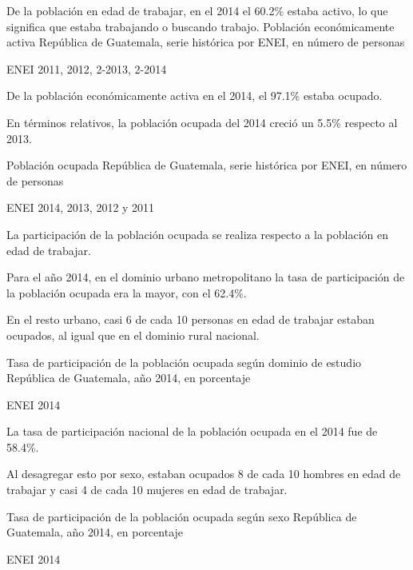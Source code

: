  
 
 {%
 De la población en edad de trabajar, en el 2014 el 60.2\% estaba activo, lo que significa que estaba trabajando o buscando trabajo.
 }%
 {%
 	Población económicamente activa} %
 {%
 	República de Guatemala, serie histórica por ENEI, en número de personas} %
 {%
 	\begin{tikzpicture}[x=1pt,y=1pt]    \end{tikzpicture}}%
 {%
 	ENEI 2011, 2012, 2-2013, 2-2014} %
 
 
  
  {%
 De la población económicamente activa en el 2014, el 97.1\% estaba ocupado.
 
 En términos relativos, la población ocupada del 2014 creció un 5.5\% respecto al 2013.}%
  {%
  	Población ocupada} %
  {%
  	República de Guatemala, serie histórica por ENEI, en número de personas} %
  {%
  	\begin{tikzpicture}[x=1pt,y=1pt]    \end{tikzpicture}}%
  {%
  	ENEI 2014, 2013, 2012 y 2011} %
  
  
  
  
  {%
La participación de la población ocupada se realiza respecto a la población en edad de trabajar.

Para el año 2014, en el dominio urbano metropolitano la tasa de participación de la población ocupada era la mayor, con el 62.4\%. 

En el resto urbano, casi 6 de cada 10 personas en edad de trabajar estaban ocupados, al igual que en el dominio rural nacional. }%
  {%
  	Tasa de participación de la población ocupada según dominio de estudio} %
  {%
  	República de Guatemala, año 2014, en porcentaje} %
  {%
  	\begin{tikzpicture}[x=1pt,y=1pt]    \end{tikzpicture}}%
  {%
  	ENEI 2014} %
  
  
 
 {%
 La tasa de participación nacional de la población ocupada en el 2014 fue de 58.4\%.
 
 Al desagregar esto por sexo, estaban ocupados 8 de cada 10 hombres en edad de trabajar y casi 4 de cada 10 mujeres en edad de trabajar.}%
 {%
 	Tasa de participación de la población ocupada según sexo} %
 {%
 	República de Guatemala, año 2014, en porcentaje} %
 {%
 	\begin{tikzpicture}[x=1pt,y=1pt]    \end{tikzpicture}}%
 {%
 	ENEI 2014} %
 
